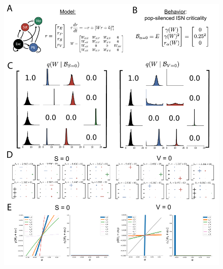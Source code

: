 \documentclass[11pt]{article}
\begin{document}
\begin{figure}
\begin{center}
\includegraphics[scale=0.5]{models/V1/V1_Fig/V1_Fig.pdf}
\end{center}
\caption{\protect}
\end{figure}

\clearpage
\end{document}
